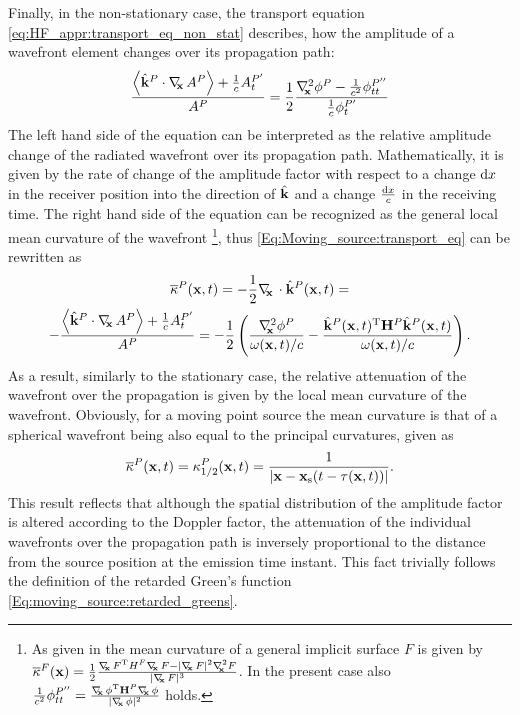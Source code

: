 Finally, in the non-stationary case, the transport equation \eqref{eq:HF_appr:transport_eq_non_stat} describes, how the amplitude of a wavefront element changes over its propagation path:
\begin{equation}
\label{Eq:Moving_source:transport_eq}
\frac{ \left< \hat{\mathbf{k}}^P \cdot \nabla_{\!\!\mathbf{x}}\, A^P \right>+\frac{1}{c} A^{P'}_t }{A^P}  = \frac{1}{2} \frac{ \nabla^2_{\!\!\mathbf{x}} \phi^P - \frac{1}{c^2} \phi^{P''}_{tt} }{\frac{1}{c}\phi^{P'}_t}
\end{equation}
The left hand side of the equation can be interpreted as the relative amplitude change of the radiated wavefront over its propagation path. 
Mathematically, it is given by the rate of change of the amplitude factor with respect to a change $\mathrm{d} x$ in the receiver position into the direction of $\hat{\mathbf{k}}$ and a change $\frac{\mathrm{d} x}{c}$ in the receiving time.
The right hand side of the equation can be recognized as the general local mean curvature of the wavefront \cite[4.2]{Goldman2005}\footnote{As given in \cite{Goldman2005} the mean curvature of a general implicit surface $F$ is given by 
$\overline{\kappa}^F(\vx) = \frac{1}{2}\frac{\Dx F^{\mathrm{T}} H^F \Dx F - |\Dx F|^2 \Lx F }{|\Dx F|^3}$. In the present case also $\frac{1}{c^2} \phi^{P''}_{tt} = \frac{\nabla_{\!\!\mathbf{x}}\, \phi^{\mathrm{T}} \mathbf{H}^P \nabla_{\!\!\mathbf{x}}\, \phi}{|\nabla_{\!\!\mathbf{x}}\, \phi|^2}$ holds.}, thus \eqref{Eq:Moving_source:transport_eq} can be rewritten as
\begin{multline}
\overline{\kappa}^P(\mathbf{x},t) = -\frac{1}{2}\nabla_{\!\!\mathbf{x}}\, \cdot \hat{\mathbf{k}}^P(\mathbf{x},t)= \\
-\frac{ \left< \hat{\mathbf{k}}^P \cdot \nabla_{\!\!\mathbf{x}}\, A^P \right>+\frac{1}{c} A^{P'}_t }{A^P} = -\frac{1}{2} \left( \frac{ \nabla^2_{\!\!\mathbf{x}} \phi^P  }{ \omega(\mathbf{x},t)/c } - \frac{ \hat{\mathbf{k}}^P(\mathbf{x},t)^{\mathrm{T}} \mathbf{H}^P \hat{\mathbf{k}}^P(\mathbf{x},t) }{ \omega(\mathbf{x},t)/c } \right).
\label{Eq:Moving_source:attenuation}
\end{multline}
As a result, similarly to the stationary case, the relative attenuation of the wavefront over the propagation is given by the local mean curvature of the wavefront.
Obviously, for a moving point source the mean curvature is that of a spherical wavefront being also equal to the principal curvatures, given as
\begin{equation}
\overline{\kappa}^P(\mathbf{x},t) = \kappa^P_{1/2}(\mathbf{x},t) = \frac{1}{|\mathbf{x}-\mathbf{x}_{\mathrm{s}}(t-\tau(\mathbf{x},t))|}.
\label{Eq:Moving_source:attenuation_2}
\end{equation}
This result reflects that although the spatial distribution of the amplitude factor is altered according to the Doppler factor, the attenuation of the individual wavefronts over the propagation path is inversely proportional to the distance from the source position at the emission time instant.
This fact trivially follows the definition of the retarded Green's function \eqref{Eq:moving_source:retarded_greens}.

